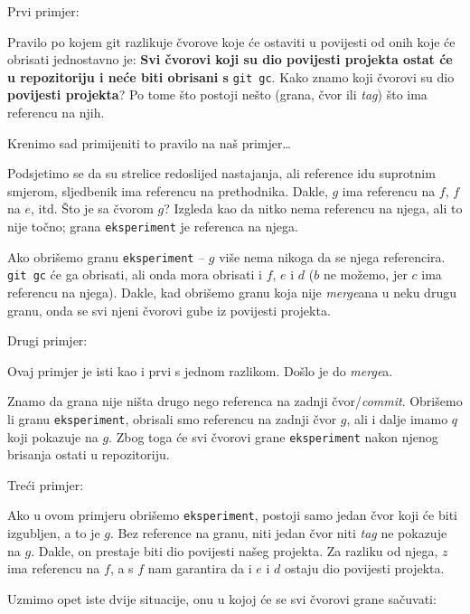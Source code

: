 Prvi primjer:



Pravilo po kojem git razlikuje čvorove koje će ostaviti u povijesti od onih koje će obrisati jednostavno je:
\textbf{Svi čvorovi koji su dio povijesti projekta ostat će u repozitoriju i neće biti obrisani s} \verb+git gc+.
Kako znamo koji čvorovi su dio \textbf{povijesti projekta}?
Po tome što postoji nešto (grana, čvor ili \emph{tag}) što ima referencu na njih.

Krenimo sad primijeniti to pravilo na naš primjer\dots

Podsjetimo se da su strelice redoslijed nastajanja, ali reference idu suprotnim smjerom, sljedbenik ima referencu na prethodnika.
Dakle, $g$ ima referencu na $f$, $f$ na $e$, itd.
Što je sa čvorom $g$? 
Izgleda kao da nitko nema referencu na njega, ali to nije točno; grana \verb+eksperiment+ je referenca na njega.

Ako obrišemo granu \verb+eksperiment+ -- $g$ više nema nikoga da se njega referencira.
\verb+git gc+ će ga obrisati, ali onda mora obrisati i $f$, $e$ i $d$ ($b$ ne možemo, jer $c$ ima referencu na njega).
Dakle, kad obrišemo granu koja nije \emph{merge}ana u neku drugu granu, onda se svi njeni čvorovi gube iz povijesti projekta.

Drugi primjer:



Ovaj primjer je isti kao i prvi s jednom razlikom. 
Došlo je do \emph{merge}a.

Znamo da grana nije ništa drugo nego referenca na zadnji čvor/\emph{commit}.
Obrišemo li granu \verb+eksperiment+, obrisali smo referencu na zadnji čvor $g$, ali i dalje imamo $q$ koji pokazuje na $g$.
Zbog toga će svi čvorovi grane \verb+eksperiment+ nakon njenog brisanja ostati u repozitoriju.

Treći primjer:



Ako u ovom primjeru obrišemo \verb+eksperiment+, postoji samo jedan čvor koji će biti izgubljen, a to je $g$.
Bez reference na granu, niti jedan čvor niti \emph{tag} ne pokazuje na $g$. Dakle, on prestaje biti dio povijesti našeg projekta.
Za razliku od njega, $z$ ima referencu na $f$, a s $f$ nam garantira da i $e$ i $d$ ostaju dio povijesti projekta.


Uzmimo opet iste dvije situacije, onu u kojoj će se svi čvorovi grane sačuvati:


